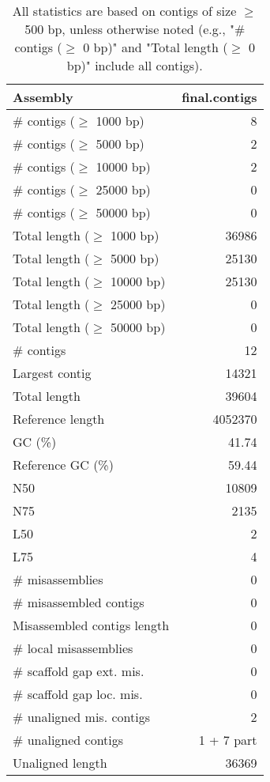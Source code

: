 \documentclass[12pt,a4paper]{article}
\begin{document}
\begin{table}[ht]
\begin{center}
\caption{All statistics are based on contigs of size $\geq$ 500 bp, unless otherwise noted (e.g., "\# contigs ($\geq$ 0 bp)" and "Total length ($\geq$ 0 bp)" include all contigs).}
\begin{tabular}{|l*{1}{|r}|}
\hline
Assembly & final.contigs \\ \hline
\# contigs ($\geq$ 1000 bp) & 8 \\ \hline
\# contigs ($\geq$ 5000 bp) & 2 \\ \hline
\# contigs ($\geq$ 10000 bp) & 2 \\ \hline
\# contigs ($\geq$ 25000 bp) & 0 \\ \hline
\# contigs ($\geq$ 50000 bp) & 0 \\ \hline
Total length ($\geq$ 1000 bp) & 36986 \\ \hline
Total length ($\geq$ 5000 bp) & 25130 \\ \hline
Total length ($\geq$ 10000 bp) & 25130 \\ \hline
Total length ($\geq$ 25000 bp) & 0 \\ \hline
Total length ($\geq$ 50000 bp) & 0 \\ \hline
\# contigs & 12 \\ \hline
Largest contig & 14321 \\ \hline
Total length & 39604 \\ \hline
Reference length & 4052370 \\ \hline
GC (\%) & 41.74 \\ \hline
Reference GC (\%) & 59.44 \\ \hline
N50 & 10809 \\ \hline
N75 & 2135 \\ \hline
L50 & 2 \\ \hline
L75 & 4 \\ \hline
\# misassemblies & 0 \\ \hline
\# misassembled contigs & 0 \\ \hline
Misassembled contigs length & 0 \\ \hline
\# local misassemblies & 0 \\ \hline
\# scaffold gap ext. mis. & 0 \\ \hline
\# scaffold gap loc. mis. & 0 \\ \hline
\# unaligned mis. contigs & 2 \\ \hline
\# unaligned contigs & 1 + 7 part \\ \hline
Unaligned length & 36369 \\ \hline

\end{tabular}
\end{center}
\end{table}
\end{document}
